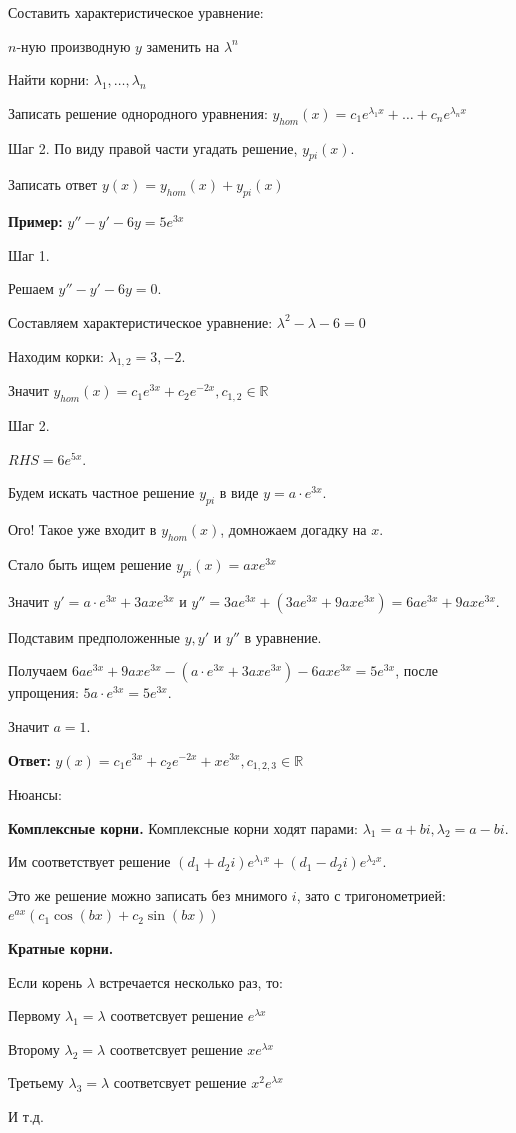 \documentclass[10pt,a4paper]{article}
\begin{document}
\par Составить характеристическое уравнение:
\par $n$-ную производную $y$ заменить на $\lambda^n$
\par Найти корни: $\lambda_1, \dots, \lambda_n$
\par Записать решение однородного уравнения: $y_{hom}(x) = c_1e^{\lambda_1x} + \dots + c_ne^{\lambda_nx}$
\par Шаг 2. По виду правой части угадать решение, $y_{pi}(x).$
\par Записать ответ $y(x) = y_{hom}(x) + y_{pi}(x)$
\par \textbf{Пример:} $y'' - y' - 6y = 5e^{3x}$
\par Шаг 1.
\par Решаем $y'' - y' - 6y = 0$.
\par Составляем характеристическое уравнение: $\lambda^2 - \lambda - 6 = 0$
\par Находим корки: $\lambda_{1,2} = 3, -2$.
\par Значит $y_{hom}(x) = c_1e^{3x} + c_2e^{-2x}, c_{1,2} \in \mathbb{R}$
\par Шаг 2.
\par $RHS = 6e^{5x}.$ 
\par Будем искать частное решение $y_{pi}$ в виде $y = a \cdot e^{3x}$. 
\par Ого! Такое уже входит в $y_{hom}(x)$, домножаем догадку на $x$.
\par Стало быть ищем решение $y_{pi}(x) = axe^{3x}$
\par Значит $y' = a \cdot e^{3x} + 3axe^{3x}$ и $y'' = 3ae^{3x} + (3ae^{3x}+ 9axe^{3x}) = 6ae^{3x} + 9axe^{3x}$.
\par Подставим предположенные $y, y'$ и $y''$ в уравнение.
\par Получаем $6ae^{3x} + 9axe^{3x} - (a \cdot e^{3x} + 3axe^{3x}) - 6axe^{3x}  = 5e^{3x}$, после упрощения: $5a \cdot e^{3x} = 5e^{3x}$.
\par Значит $a = 1.$ 
\par \textbf{Ответ:} $y(x) = c_1e^{3x} + c_2e^{-2x} + xe^{3x}, c_{1, 2, 3} \in \mathbb{R}$ \\
\par Нюансы: 
\par \textbf{Комплексные корни.} Комплексные корни ходят парами: $\lambda_1 = a+ bi, \lambda_2 = a - bi$.
\par Им соответствует решение $(d_1 + d_2i)e^{\lambda_1 x} + (d_1 - d_2i)e^{\lambda_2 x}$.
\par Это же решение можно записать без мнимого $i$, зато с тригонометрией: $e^{ax}(c_1\cos(bx) + c_2\sin(bx))$
\par \textbf{Кратные корни.}
\par Если корень $\lambda$ встречается несколько раз, то:
\par Первому $\lambda_1 = \lambda$ соответсвует решение $e^{\lambda x}$
\par Второму $\lambda_2 = \lambda$ соответсвует решение $xe^{\lambda x}$
\par Третьему $\lambda_3 = \lambda$ соответсвует решение $x^2e^{\lambda x}$
\par И т.д.
\end{document}

